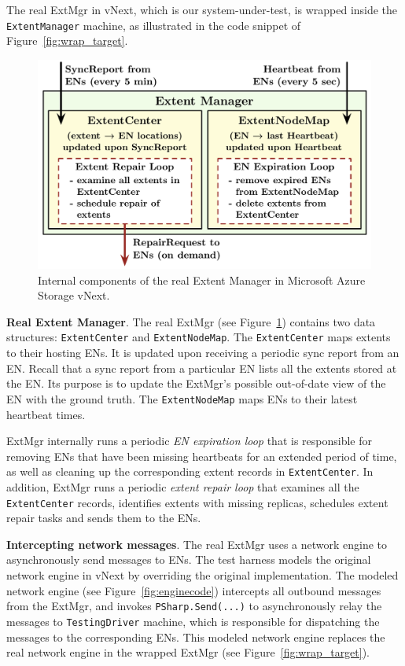The real ExtMgr in vNext, which is our system-under-test, is wrapped inside the \texttt{ExtentManager} machine, as illustrated in the code snippet of Figure~\ref{fig:wrap_target}.

\begin{figure}[t]
\centering
\includegraphics[width=.95\linewidth]{img/extent_manager}
\vspace{-2mm}
\caption{Internal components of the real Extent Manager in Microsoft Azure Storage vNext.}
\label{fig:extentmanager}
\vspace{-2mm}
\end{figure}

\textbf{Real Extent Manager}.
The real ExtMgr (see Figure~\ref{fig:extentmanager}) contains two data structures: \texttt{ExtentCenter} and \texttt{ExtentNodeMap}. The \texttt{ExtentCenter} maps extents to their hosting ENs. It is updated upon receiving a periodic sync report from an EN. Recall that a sync report from a particular EN lists all the extents stored at the EN. Its purpose is to update the ExtMgr's possible out-of-date view of the EN with the ground truth. The \texttt{ExtentNodeMap} maps ENs to their latest heartbeat times.

ExtMgr internally runs a periodic \emph{EN expiration loop} that is responsible for removing ENs that have been missing heartbeats for an extended period of time, as well as cleaning up the corresponding extent records in \texttt{ExtentCenter}. In addition, ExtMgr runs a periodic \emph{extent repair loop} that examines all the \texttt{ExtentCenter} records, identifies extents with missing replicas, schedules extent repair tasks and sends them to the ENs.

\textbf{Intercepting network messages}.
The real ExtMgr uses a network engine to asynchronously send messages to ENs. The \psharp test harness models the original network engine in vNext by overriding the original implementation. The modeled network engine (see Figure~\ref{fig:enginecode}) intercepts all outbound messages from the ExtMgr, and invokes \texttt{PSharp.Send(...)} to asynchronously relay the messages to \texttt{TestingDriver} machine, which is responsible for dispatching the messages to the corresponding ENs. This modeled network engine replaces the real network engine in the wrapped ExtMgr (see Figure~\ref{fig:wrap_target}).

